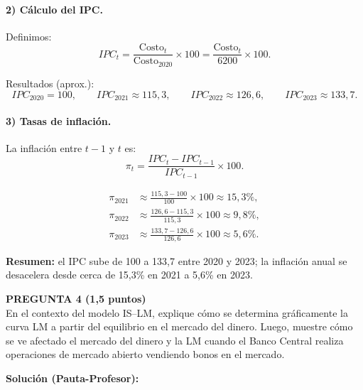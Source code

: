 \documentclass[11pt,addpoints]{article}
\begin{document}
\paragraph{2) Cálculo del IPC.}

Definimos:
\[
IPC_t = \frac{\text{Costo}_t}{\text{Costo}_{2020}} \times 100
      = \frac{\text{Costo}_t}{6200}\times 100.
\]

Resultados (aprox.):
\[
IPC_{2020} = 100, \qquad
IPC_{2021} \approx 115{,}3, \qquad
IPC_{2022} \approx 126{,}6, \qquad
IPC_{2023} \approx 133{,}7.
\]

\paragraph{3) Tasas de inflación.}

La inflación entre $t-1$ y $t$ es:
\[
\pi_t = \frac{IPC_t - IPC_{t-1}}{IPC_{t-1}} \times 100.
\]

\begin{align*}
\pi_{2021} &\approx \frac{115{,}3 - 100}{100}\times 100 \approx 15{,}3\%,\\
\pi_{2022} &\approx \frac{126{,}6 - 115{,}3}{115{,}3}\times 100 \approx 9{,}8\%,\\
\pi_{2023} &\approx \frac{133{,}7 - 126{,}6}{126{,}6}\times 100 \approx 5{,}6\%.
\end{align*}

\medskip
\textbf{Resumen:} el IPC sube de 100 a 133{,}7 entre 2020 y 2023; la inflación anual se desacelera desde cerca de 15,3\% en 2021 a 5,6\% en 2023.

\vspace{0.4cm}

\textbf{PREGUNTA 4 (1,5 puntos)}\\[0.2cm]
En el contexto del modelo IS--LM, explique cómo se determina gráficamente la curva LM a partir del equilibrio en el mercado del dinero. Luego, muestre cómo se ve afectado el mercado del dinero y la LM cuando el Banco Central realiza operaciones de mercado abierto vendiendo bonos en el mercado.

\textbf{Solución (Pauta-Profesor):}
\end{document}
